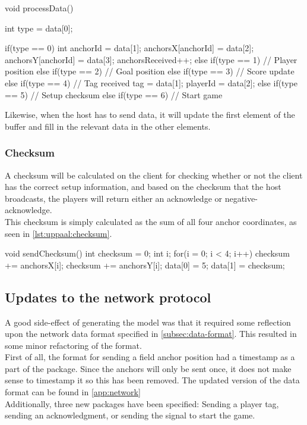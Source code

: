 \begin{uppaalcode}[caption={Processing Data in \uppaal model}, captionpos=b,label={lst:uppaal:processData},numbers=left]
void processData(){
    int type = data[0];
    
    if(type == 0){
        int anchorId = data[1];
        anchorsX[anchorId] = data[2];
        anchorsY[anchorId] = data[3];
        anchorsReceived++;
    } else if(type == 1){
        // Player position
    } else if(type == 2){
        // Goal position
    } else if(type == 3){
        // Score update
    } else if(type == 4){
        // Tag received
        tag = data[1];
        playerId = data[2];
    } else if(type == 5){
        // Setup checksum
    } else if(type == 6){
        // Start game
    }
}
\end{uppaalcode}
\noindent
Likewise, when the host has to send data, it will update the first element of the buffer and fill in the relevant data in the other elements.

\subsubsection{Checksum}
A checksum will be calculated on the client for checking whether or not the client has the correct setup information, and based on the checksum that the host broadcasts, the players will return either an acknowledge or negative-acknowledge.
\\
This checksum is simply calculated as the sum of all four anchor coordinates, as seen in \autoref{lst:uppaal:checksum}.

\begin{uppaalcode}[caption={Calculating checksum in \uppaal model}, captionpos=b,label={lst:uppaal:checksum},numbers=left]
void sendChecksum(){
    int checksum = 0;
    int i;
    for(i = 0; i < 4; i++){
        checksum += anchorsX[i];
        checksum += anchorsY[i];
    }
    data[0] = 5;
    data[1] = checksum;   
}
\end{uppaalcode}

\subsection{Updates to the network protocol}\label{subsec:sprint3networkupdate}
A good side-effect of generating the \uppaal model was that it required some reflection upon the network data format specified in \autoref{subsec:data-format}.
This resulted in some minor refactoring of the format.
\\
First of all, the format for sending a field anchor position had a timestamp as a part of the package. 
Since the anchors will only be sent once, it does not make sense to timestamp it so this has been removed.
The updated version of the data format can be found in \autoref{app:network}
\\
Additionally, three new packages have been specified: Sending a player tag, sending an acknowledgment, or sending the signal to start the game.

